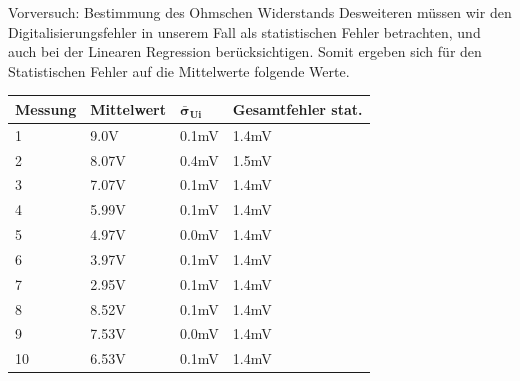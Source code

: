 \documentclass[twoside]{protokoll}
\begin{document}
\begin{aufgabe}{Vorversuch: Bestimmung des Ohmschen Widerstands}
Desweiteren müssen wir den Digitalisierungsfehler in unserem Fall als statistischen Fehler betrachten, und auch bei der Linearen Regression berücksichtigen. 
Somit ergeben sich für den Statistischen Fehler auf die Mittelwerte folgende Werte.

\begin{table}[H]
    \centering
    \begin{tabularx}{1\textwidth}{X X X X} %
        \toprule
        \textbf{Messung} & \textbf{Mittelwert} & $\pmb{\bar{\sigma}_{Ui}}$ & \textbf{Gesamtfehler stat.} \\
        \midrule
         
        1 & 9.0V & 0.1mV & 1.4mV \\
        2 & 8.07V & 0.4mV & 1.5mV \\
        3 & 7.07V & 0.1mV & 1.4mV \\
        4 & 5.99V & 0.1mV & 1.4mV \\
        5 & 4.97V & 0.0mV & 1.4mV \\
        6 & 3.97V & 0.1mV & 1.4mV \\
        7 & 2.95V & 0.1mV & 1.4mV \\
        8 & 8.52V & 0.1mV & 1.4mV \\
        9 & 7.53V & 0.0mV & 1.4mV \\
        10 & 6.53V & 0.1mV & 1.4mV \\
         

\end{tabularx}
\end{table}
\end{aufgabe}
\end{document}
